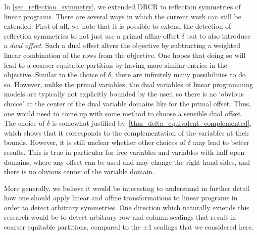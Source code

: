 \documentclass[pdflatex,sn-mathphys-num]{sn-jnl}%
\theoremstyle{thmstyleone}%
\theoremstyle{thmstylethree}%
\theoremstyle{thmstyletwo}%
\begin{document}
In \cref{sec_reflection_symmetry}, we extended DRCR to reflection symmetries of linear programs. There are several ways in which the current work can still be extended.
First of all, we note that it is possible to extend the detection of reflection symmetries to not just use a primal affine offset $\delta$ but to also introduce a \emph{dual offset}. Such a dual offset alters the objective by subtracting a weighted linear combination of the rows from the objective. One hopes that doing so will lead to a coarser equitable partition by having more similar entries in the objective.
Similar to the choice of $\delta$, there are infinitely many possibilities to do so. However, unlike the primal variables, the dual variables of linear programming models are typically not explicitly bounded by the user, so there is no `obvious choice' at the center of the dual variable domains like for the primal offset. Thus, one would need to come up with some method to choose a sensible dual offset. \\

The choice of $\delta$ is somewhat justified by~\cref{thm_delta_equivalent_complemented}, which shows that it corresponds to the complementation of the variables at their bounds. However, it is still unclear whether other choices of $\delta$ may lead to better results. This is true in particular for free variables and variables with half-open domains, where any offset can be used and may change the right-hand sides, and there is no obvious center of the variable domain.

More generally, we believe it would be interesting to understand in further detail how one should apply linear and affine transformations to linear programs in order to detect arbitrary symmetries. One direction which naturally extends this research would be to detect arbitrary row and column scalings that result in coarser equitable partitions, compared to the $\pm 1$ scalings that we considered here.\\
\end{document}
